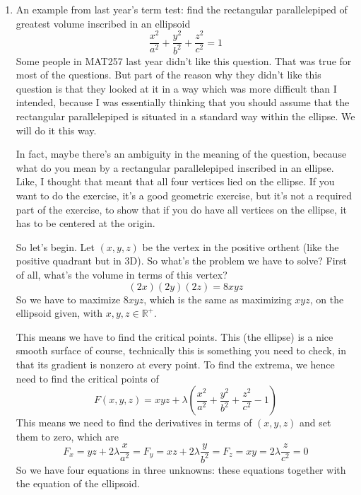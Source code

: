 \documentclass{article}
\newcommand{\reals}[0]{\mathbb{R}}
\begin{document}
\begin{enumerate}
\begin{proof}
    We begin by assuming
    \[\sum_{i = 1}^nu_i^\alpha, \sum_{i = 1}^nv_i\alpha \neq 0\]
    since if either are zero then the inequality holds trivially.

    We can now apply the preceding inequality to
    \[u = \frac{u_i}{\left(\sum_{i = 1}^nu_i^\alpha\right)^{1/\alpha}}, v = \frac{v_i}{\left(\sum_{i = 1}^nv_i^\beta\right)^{1/\beta}}\]
    for each \(u_i, v_i\), from which the result follows.
  \end{proof}

  \item An example from last year's term test: find the rectangular parallelepiped of greatest volume inscribed in an ellipsoid
  \[\frac{x^2}{a^2} + \frac{y^2}{b^2} + \frac{z^2}{c^2} = 1\]
  Some people in MAT257 last year didn't like this question. That was true for most of the questions. But part of the reason why they didn't like this question is that they looked at it in a way which was more difficult than I intended, because I was essentially thinking that you should assume that the rectangular parallelepiped is situated in a standard way within the ellipse. We will do it this way.

  In fact, maybe there's an ambiguity in the meaning of the question, because what do you mean by a rectangular parallelepiped inscribed in an ellipse. Like, I thought that meant that all four vertices lied on the ellipse. If you want to do the exercise, it's a good geometric exercise, but it's not a required part of the exercise, to show that if you do have all vertices on the ellipse, it has to be centered at the origin.

  So let's begin. Let \((x, y, z)\) be the vertex in the positive orthent (like the positive quadrant but in 3D). So what's the problem we have to solve? First of all, what's the volume in terms of this vertex?
  \[(2x)(2y)(2z) = 8xyz\]
  So we have to maximize \(8xyz\), which is the same as maximizing \(xyz\), on the ellipsoid  given, with \(x, y, z \in \reals^+\).

  This means we have to find the critical points. This (the ellipse) is a nice smooth surface of course, technically this is something you need to check, in that its gradient is nonzero at every point. To find the extrema, we hence need to find the critical points of
  \[F(x, y, z) = xyz + \lambda\left(\frac{x^2}{a^2} + \frac{y^2}{b^2} + \frac{z^2}{c^2} - 1\right)\]
  This means we need to find the derivatives in terms of \((x, y, z)\) and set them to zero, which are
  \[F_x = yz + 2\lambda\frac{x}{a^2} = F_y = xz + 2\lambda\frac{y}{b^2} = F_z = xy = 2\lambda\frac{z}{c^2} = 0\]
  So we have four equations in three unknowns: these equations together with the equation of the ellipsoid.


\end{enumerate}
\end{document}
